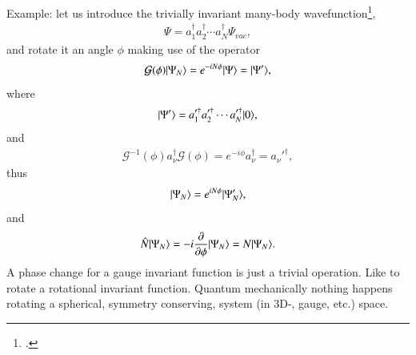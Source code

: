 Example: let us introduce the trivially invariant many-body wavefunction\footnote{\cite{Anderson:64b}.},
\begin{align}\label{eq3.7.12}
\Psi=a_1^\dagger a_2^\dagger\dotsb a_N^\dagger \Psi_{vac},
\end{align}
and rotate it an angle $\phi$ making use of the operator
\begin{align}\label{eq3.7.13}
\mathcal G(\phi)|{\Psi_N} \rangle=e^{-iN\phi}|{\Psi} \rangle=|{\Psi'} \rangle,
\end{align}
where
\begin{align}\label{eq3.7.14}
|{\Psi'} \rangle=a_1'^\dagger a_2'^\dagger\dotsb a_N'^\dagger|{0} \rangle,
\end{align}
and
\begin{align}\label{eq3.7.15}
\mathcal G^{-1}(\phi)a_\nu^\dagger \mathcal G(\phi)=e^{-i\phi}a_\nu^\dagger=a_\nu'^\dagger,
\end{align}
thus
\begin{align}\label{eq3.7.16}
|{\Psi_N} \rangle=e^{iN\phi}|{\Psi'_N} \rangle,
\end{align}
and
\begin{align}\label{eq3.7.17}
\hat N|{\Psi_N} \rangle=-i\frac{\partial}{\partial \phi}|{\Psi_N} \rangle=N|{\Psi_N} \rangle.
\end{align}
 A phase change for a gauge invariant function is just a trivial operation. Like to rotate a rotational invariant function. Quantum mechanically nothing happens rotating a spherical, symmetry conserving, system (in 3D-, gauge, etc.) space.



